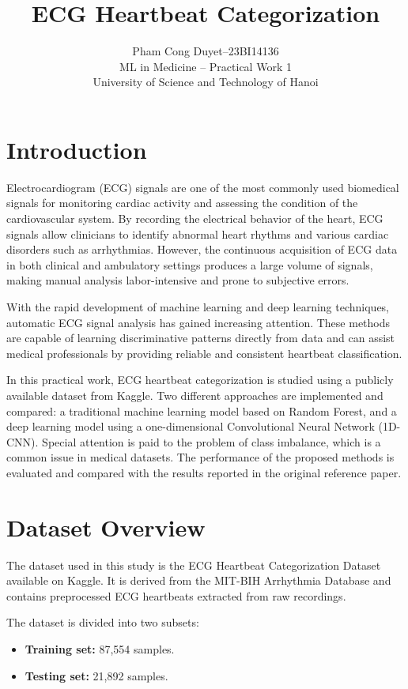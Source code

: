 \documentclass{IEEEtran}
\title{ECG Heartbeat Categorization}
\author{
    Pham Cong Duyet--23BI14136\\
    ML in Medicine -- Practical Work 1\\
    University of Science and Technology of Hanoi
}
\begin{document}
\maketitle

\section{Introduction}

Electrocardiogram (ECG) signals are one of the most commonly used biomedical
signals for monitoring cardiac activity and assessing the condition of the
cardiovascular system. By recording the electrical behavior of the heart,
ECG signals allow clinicians to identify abnormal heart rhythms and various
cardiac disorders such as arrhythmias. However, the continuous acquisition
of ECG data in both clinical and ambulatory settings produces a large volume
of signals, making manual analysis labor-intensive and prone to subjective
errors.

With the rapid development of machine learning and deep learning techniques,
automatic ECG signal analysis has gained increasing attention. These methods
are capable of learning discriminative patterns directly from data and can
assist medical professionals by providing reliable and consistent heartbeat
classification.

In this practical work, ECG heartbeat categorization is studied using a
publicly available dataset from Kaggle. Two different approaches are
implemented and compared: a traditional machine learning model based on
Random Forest, and a deep learning model using a one-dimensional
Convolutional Neural Network (1D-CNN). Special attention is paid to the
problem of class imbalance, which is a common issue in medical datasets.
The performance of the proposed methods is evaluated and compared with the
results reported in the original reference paper.

\section{Dataset Overview}

The dataset used in this study is the ECG Heartbeat Categorization Dataset
available on Kaggle. It is derived from the MIT-BIH Arrhythmia Database and
contains preprocessed ECG heartbeats extracted from raw recordings.

The dataset is divided into two subsets:
\begin{itemize}
    \item \textbf{Training set:} 87,554 samples.
    \item \textbf{Testing set:} 21,892 samples.
\end{itemize}
\end{document}
